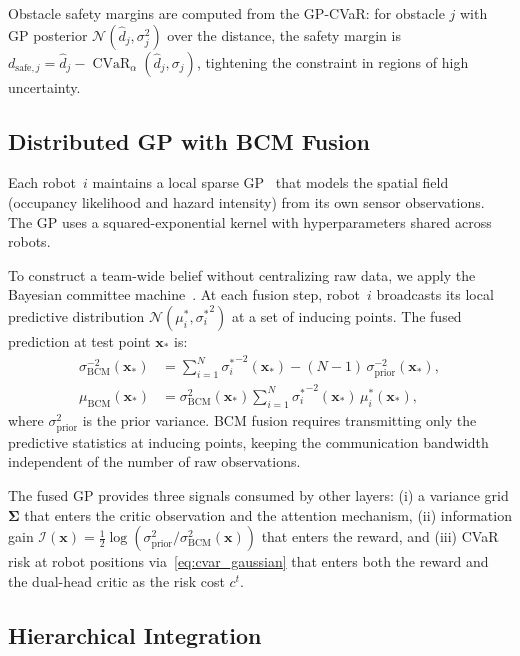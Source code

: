 \documentclass[letterpaper]{IEEEtran}
\newcommand{\xbf}{\mathbf{x}}
\DeclareMathOperator{\CVaR}{CVaR}
\begin{document}
Obstacle safety margins are computed from the GP-CVaR: for obstacle $j$ with GP posterior $\mathcal{N}(\hat{d}_j, \sigma_j^2)$ over the distance, the safety margin is $d_{\text{safe},j} = \hat{d}_j - \CVaR_\alpha(\hat{d}_j, \sigma_j)$, tightening the constraint in regions of high uncertainty.

\subsection{Distributed GP with BCM Fusion}
\label{sec:gp}

Each robot~$i$ maintains a local sparse GP~\cite{titsias2009variational} that models the spatial field (occupancy likelihood and hazard intensity) from its own sensor observations. The GP uses a squared-exponential kernel with hyperparameters shared across robots.

To construct a team-wide belief without centralizing raw data, we apply the Bayesian committee machine~\cite{tresp2000bcm}. At each fusion step, robot~$i$ broadcasts its local predictive distribution $\mathcal{N}(\mu_i^*, {\sigma_i^*}^2)$ at a set of inducing points. The fused prediction at test point $\xbf_*$ is:
\begin{align}
\sigma_{\text{BCM}}^{-2}(\xbf_*) &= \textstyle\sum_{i=1}^{N} {\sigma_i^*}^{-2}(\xbf_*) - (N{-}1)\,\sigma_{\text{prior}}^{-2}(\xbf_*), \label{eq:bcm_var} \\
\mu_{\text{BCM}}(\xbf_*) &= \sigma_{\text{BCM}}^2(\xbf_*) \textstyle\sum_{i=1}^{N} {\sigma_i^*}^{-2}(\xbf_*)\,\mu_i^*(\xbf_*), \label{eq:bcm_mean}
\end{align}
where $\sigma_{\text{prior}}^2$ is the prior variance. BCM fusion requires transmitting only the predictive statistics at inducing points, keeping the communication bandwidth independent of the number of raw observations.

The fused GP provides three signals consumed by other layers: (i) a variance grid $\bm{\Sigma}$ that enters the critic observation and the attention mechanism, (ii) information gain $\mathcal{I}(\xbf) = \frac{1}{2}\log(\sigma_{\text{prior}}^2 / \sigma_{\text{BCM}}^2(\xbf))$ that enters the reward, and (iii) CVaR risk at robot positions via~\eqref{eq:cvar_gaussian} that enters both the reward and the dual-head critic as the risk cost $c^t$.

\subsection{Hierarchical Integration}
\label{sec:hierarchy}
\end{document}
